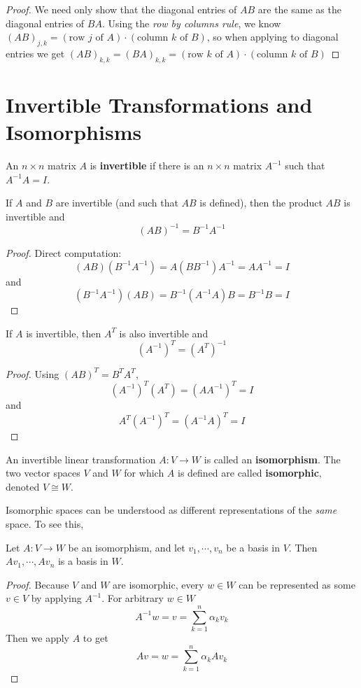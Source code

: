 \begin{proof}
We need only show that the diagonal entries of $AB$ are the same as the diagonal entries of $BA$. Using the \textit{row by columns rule}, we know $(AB)_{j, k} = (\text{row $j$ of $A$}) \cdot (\text{column $k$ of $B$})$, so when applying to diagonal entries we get $(AB)_{k, k} = (BA)_{k, k} = (\text{row $k$ of $A$}) \cdot (\text{column $k$ of $B$})$
\end{proof}

\section{Invertible Transformations and Isomorphisms}
\begin{definition}
An $n \times n$ matrix $A$ is \textbf{invertible} if there is an $n \times n$ matrix $A^{-1}$ such that $A^{-1}A = I$. 
\end{definition}

\begin{theorem}
If $A$ and $B$ are invertible (and such that $AB$ is defined), then the product $AB$ is invertible and 
$$(AB)^{-1} = B^{-1} A^{-1}$$
\end{theorem}

\begin{proof}
Direct computation:
$$(AB)(B^{-1}A^{-1}) = A(BB^{-1})A^{-1} = AA^{-1} = I$$
and 
$$(B^{-1}A^{-1})(AB) = B^{-1}(A^{-1}A)B = B^{-1}B = I$$
\end{proof}

\begin{theorem}
If $A$ is invertible, then $A^{T}$ is also invertible and 
$$(A^{-1})^{T} = (A^{T})^{-1}$$
\end{theorem}

\begin{proof}
Using $(AB)^{T} = B^{T} A^{T}$, 
$$(A^{-1})^{T} (A^{T}) = (AA^{-1})^{T} = I$$
and 
$$A^{T}(A^{-1})^{T} = (A^{-1}A)^{T} = I$$
\end{proof}

\begin{definition}
An invertible linear transformation $A: V \rightarrow W$ is called an \textbf{isomorphism}. The two vector spaces $V$ and $W$ for which $A$ is defined are called \textbf{isomorphic}, denoted $V \cong W$. 
\end{definition}

Isomorphic spaces can be understood as different representations of the \textit{same} space. To see this, 
\begin{theorem}
Let $A : V \rightarrow W$ be an isomorphism, and let $v_{1}, \cdots, v_{n}$ be a basis in $V$. Then $Av_{1}, \cdots, Av_{n}$ is a basis in $W$. 
\end{theorem}

\begin{proof}
Because $V$ and $W$ are isomorphic, every $w \in W$ can be represented as some $v \in V$ by applying $A^{-1}$. For arbitrary $w \in W$
$$A^{-1}w = v = \sum_{k=1}^{n} \alpha_{k} v_{k}$$
Then we apply $A$ to get 
$$Av = w = \sum_{k=1}^{n} \alpha_{k} Av_{k}$$
\end{proof}